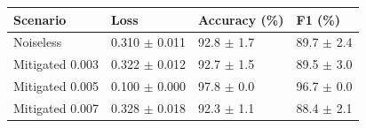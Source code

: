 \begin{tabular}{llll}
\toprule
Scenario & Loss & Accuracy (\%) & F1 (\%) \\
\midrule
Noiseless & 0.310 $\pm$ 0.011 & 92.8 $\pm$ 1.7 & 89.7 $\pm$ 2.4 \\
Mitigated 0.003 & 0.322 $\pm$ 0.012 & 92.7 $\pm$ 1.5 & 89.5 $\pm$ 3.0 \\
Mitigated 0.005 & 0.100 $\pm$ 0.000 & 97.8 $\pm$ 0.0 & 96.7 $\pm$ 0.0 \\
Mitigated 0.007 & 0.328 $\pm$ 0.018 & 92.3 $\pm$ 1.1 & 88.4 $\pm$ 2.1 \\
\bottomrule
\end{tabular}
